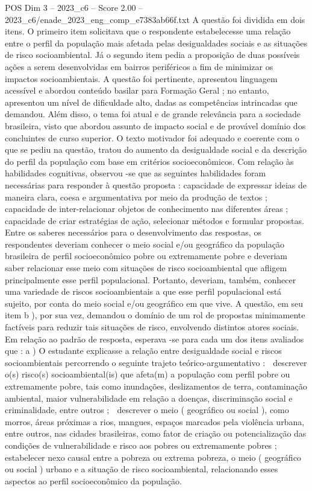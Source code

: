 \begin{textsample}{POS Dim 3 – 2023\_c6 – Score 2.00 – 2023\_c6/enade\_2023\_eng\_comp\_e7383ab66f.txt}
A questão foi dividida em dois itens.
O primeiro item solicitava que o respondente estabelecesse uma relação entre o perfil da população mais afetada pelas desigualdades sociais e as situações de risco socioambiental.
Já o segundo item pedia a proposição de duas possíveis ações a serem desenvolvidas em bairros periféricos a fim de minimizar os impactos socioambientais.
A questão foi pertinente, apresentou linguagem acessível e abordou conteúdo basilar para Formação Geral ; no entanto, apresentou um nível de dificuldade alto, dadas as competências intrincadas que demandou.
Além disso, o tema foi atual e de grande relevância para a sociedade brasileira, visto que abordou assunto de impacto social e de provável domínio dos concluintes de curso superior.
O texto motivador foi adequado e coerente com o que se pediu na questão, tratou do aumento da desigualdade social e da descrição do perfil da população com base em critérios socioeconômicos.
Com relação às habilidades cognitivas, observou -se que as seguintes habilidades foram necessárias para responder à questão proposta : capacidade de expressar ideias de maneira clara, coesa e argumentativa por meio da produção de textos ; capacidade de inter-relacionar objetos de conhecimento nas diferentes áreas ; capacidade de criar estratégias de ação, selecionar métodos e formular propostas.
Entre os saberes necessários para o desenvolvimento das respostas, os respondentes deveriam conhecer o meio social e/ou geográfico da população brasileira de perfil socioeconômico pobre ou extremamente pobre e deveriam saber relacionar esse meio com situações de risco socioambiental que afligem principalmente esse perfil populacional.
Portanto, deveriam, também, conhecer uma variedade de riscos socioambientais a que esse perfil populacional está sujeito, por conta do meio social e/ou geográfico em que vive.
A questão, em seu item b ), por sua vez, demandou o domínio de um rol de propostas minimamente factíveis para reduzir tais situações de risco, envolvendo distintos atores sociais.
Em relação ao padrão de resposta, esperava -se para cada um dos itens avaliados que : a ) O estudante explicasse a relação entre desigualdade social e riscos socioambientais percorrendo o seguinte trajeto teórico-argumentativo :  descrever o(s) risco(s) socioambiental(is) que afeta(m) a população com perfil pobre ou extremamente pobre, tais como inundações, deslizamentos de terra, contaminação ambiental, maior vulnerabilidade em relação a doenças, discriminação social e criminalidade, entre outros ;  descrever o meio ( geográfico ou social ), como morros, áreas próximas a rios, mangues, espaços marcados pela violência urbana, entre outros, nas cidades brasileiras, como fator de criação ou potencialização das condições de vulnerabilidade e risco aos pobres ou extremamente pobres ;  estabelecer nexo causal entre a pobreza ou extrema pobreza, o meio ( geográfico ou social ) urbano e a situação de risco socioambiental, relacionando esses aspectos ao perfil socioeconômico da população.

\end{textsample}
